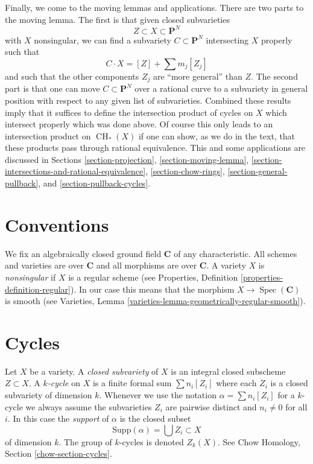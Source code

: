 \documentclass{stacks-project}
\theoremstyle{plain}
\theoremstyle{definition}
\theoremstyle{remark}
\numberwithin{equation}{subsection}
\def\Spec{\mathop{\mathrm{Spec}}}
\def\CH{\mathop{\mathrm{CH}}\nolimits}
\begin{document}
\medskip\noindent
Finally, we come to the moving lemmas and applications. There are two
parts to the moving lemma. The first is that given closed subvarieties
$$
Z \subset X \subset \mathbf{P}^N
$$
with $X$ nonsingular, we can find a subvariety $C \subset \mathbf{P}^N$
intersecting $X$ properly such that
$$
C \cdot X = [Z] + \sum m_j [Z_j]
$$
and such that the other components $Z_j$ are ``more general'' than $Z$.
The second part is that one can move $C \subset \mathbf{P}^N$ over
a rational curve to a subvariety in general position with respect to
any given list of subvarieties. Combined these results imply that it suffices
to define the intersection product of cycles on $X$ which intersect
properly which was done above. Of course this only leads to an intersection
product on $\CH_*(X)$ if one can show, as we do in the text, that these products
pass through rational equivalence. This and some applications are discussed 
in Sections
\ref{section-projection},
\ref{section-moving-lemma},
\ref{section-intersections-and-rational-equivalence},
\ref{section-chow-rings},
\ref{section-general-pullback}, and
\ref{section-pullback-cycles}.



\section{Conventions}
\label{section-conventions}

\noindent
We fix an algebraically closed ground field $\mathbf{C}$ of any
characteristic. All schemes and varieties are over $\mathbf{C}$ and all
morphisms are over $\mathbf{C}$. A variety $X$ is
{\it nonsingular} if $X$ is a regular scheme (see
Properties, Definition \ref{properties-definition-regular}).
In our case this means that the morphism $X \to \Spec(\mathbf{C})$
is smooth (see
Varieties, Lemma \ref{varieties-lemma-geometrically-regular-smooth}).


\section{Cycles}
\label{section-cycles}

\noindent
Let $X$ be a variety. A {\it closed subvariety} of $X$ is an integral
closed subscheme $Z \subset X$. A {\it $k$-cycle} on $X$ is a finite
formal sum $\sum n_i [Z_i]$ where each $Z_i$ is a closed subvariety
of dimension $k$. Whenever we use the notation $\alpha = \sum n_i[Z_i]$
for a $k$-cycle we always assume the subvarieties $Z_i$ are pairwise
distinct and $n_i \not = 0$ for all $i$. In this case the
{\it support} of $\alpha$ is the closed subset
$$
\text{Supp}(\alpha) = \bigcup Z_i \subset X
$$
of dimension $k$. The group of $k$-cycles is denoted $Z_k(X)$.
See Chow Homology, Section \ref{chow-section-cycles}.
\end{document}
